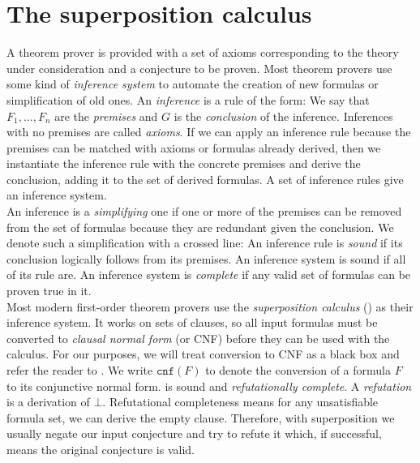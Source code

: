 \section{The superposition calculus}
A theorem prover is provided with a set of axioms corresponding to the theory under consideration and a conjecture to be proven. Most theorem provers use some kind of \textit{inference system} to automate the creation of new formulas or simplification of old ones. An \textit{inference} is a rule of the form:
We say that $F_1,...,F_n$ are the \textit{premises} and $G$ is the \textit{conclusion} of the inference. Inferences with no premises are called \textit{axioms}. If we can apply an inference rule because the premises can be matched with axioms or formulas already derived, then we instantiate the inference rule with the concrete premises and derive the conclusion, adding it to the set of derived formulas. A set of inference rules give an inference system.\medskip\\
An inference is a \textit{simplifying} one if one or more of the premises can be removed from the set of formulas because they are redundant given the conclusion. We denote such a simplification with a crossed line:
An inference rule is \textit{sound} if its conclusion logically follows from its premises. An inference system is sound if all of its rule are. An inference system is \textit{complete} if any valid set of formulas can be proven true in it.\medskip\\
Most modern first-order theorem provers use the \textit{superposition calculus} (\Sup) as their inference system. It works on sets of clauses, so all input formulas must be converted to \textit{clausal normal form} (or CNF) before they can be used with the calculus. For our purposes, we will treat conversion to CNF as a black box and refer the reader to \cite{vcnf}. We write $\mathtt{cnf}(F)$ to denote the conversion of a formula $F$ to its conjunctive normal form. \Sup is sound and \textit{refutationally complete}. A \textit{refutation} is a derivation of $\bot$. Refutational completeness means for any unsatisfiable formula set, we can derive the empty clause. Therefore, with superposition we usually negate our input conjecture and try to refute it which, if successful, means the original conjecture is valid.\medskip\\
